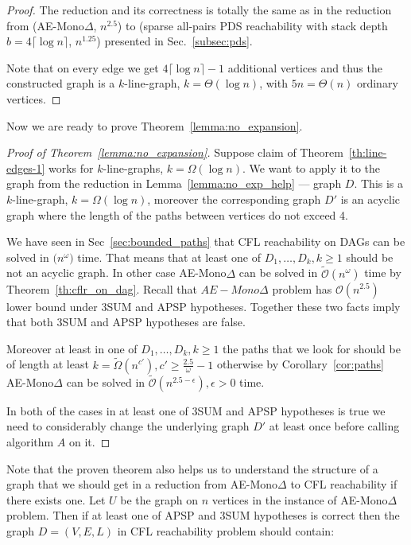 \documentclass[12pt]{article}
\begin{document}
\begin{proof}
The reduction and its correctness is totally the same as in the reduction from (AE-Mono$\Delta$, $n^{2.5}$) to (sparse all-pairs PDS reachability with stack depth $b = 4 \lceil \log n \rceil$, $n^{1.25}$) presented in Sec.~\ref{subsec:pds}. 

Note that on every edge we get $4 \lceil \log n \rceil - 1$ additional vertices and thus the constructed graph is a $k$-line-graph, $k = \Theta(\log n)$, with $5n = \Theta(n)$ ordinary vertices.
\end{proof}

Now we are ready to prove Theorem~\ref{lemma:no_expansion}.

\begin{proof}[Proof of Theorem~\ref{lemma:no_expansion}]
Suppose claim of Theorem~\ref{th:line-edges-1} works for $k$-line-graphs, $k = \Omega(\log n)$. We want to apply it to the graph from the reduction in Lemma~\ref{lemma:no_exp_help} --- graph $D$. This is a $k$-line-graph, $k = \Omega(\log n)$, moreover the corresponding graph $D'$ is an acyclic graph where the length of the paths between vertices do not exceed 4.

We have seen in Sec~\ref{sec:bounded_paths} that CFL reachability on DAGs can be solved in $\mathcal(n^{\omega})$ time. That means that at least one of $D_1, \ldots, D_k, k \ge 1$ should be not an acyclic graph. In other case AE-Mono$\Delta$ can be solved in $\tilde{\mathcal{O}}(n^{\omega})$ time by Theorem~\ref{th:cflr_on_dag}. Recall that $AE-Mono\Delta$ problem has $\mathcal{O}(n^{2.5})$ lower bound under 3SUM and APSP hypotheses. Together these two facts imply that both 3SUM and APSP hypotheses are false.


Moreover at least in one of $D_1, \ldots, D_k, k \ge 1$ the paths that we look for should be of length at least $k = \tilde{\Omega}(n^{c'}), c' \ge \frac{2.5}{\omega} - 1$ otherwise by Corollary~\ref{cor:paths} AE-Mono$\Delta$ can be solved in $\tilde{\mathcal{O}}(n^{2.5 - \epsilon}), \epsilon > 0$ time. 

In both of the cases in at least one of 3SUM and APSP hypotheses is true we need to considerably change the underlying graph $D'$ at least once before calling algorithm $A$ on it.  
\end{proof}

Note that the proven theorem also helps us to understand the structure of a graph that we should get in a reduction from AE-Mono$\Delta$ to CFL reachability if there exists one. Let $U$ be the graph on $n$ vertices in the instance of AE-Mono$\Delta$ problem. Then if at least one of APSP and 3SUM hypotheses is correct then the graph $D=(V, E, L)$ in CFL reachability problem should contain:
\end{document}
